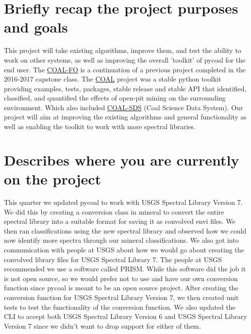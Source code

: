 \documentclass[onecolumn, draftclsnofoot,10pt, compsoc]{IEEEtran}
\begin{document}
\section{Briefly recap the project purposes and goals}

\noindent This project will take existing algorithms, improve them, and test the ability to work on other systems, as well as improving the overall 'toolkit' of pycoal for the end user. The \href{https://capstone-coal.github.io/team}{COAL-FO} is a continuation of a previous project completed in the 2016-2017 capstone class. The \href{https://capstone-coal.github.io/}{COAL} project was a stable python toolkit providing examples, tests, packages, stable release and stable API that identified, classified, and quantified the effects of open-pit mining on the surrounding environment. Which also included \href{https://github.com/capstone-coal/coal-sds}{COAL-SDS} (Coal Science Data System). Our project will aim at improving the existing algorithms and general functionality as well as enabling the toolkit to work with more spectral libraries. \newline

\section{Describes where you are currently on the project}
This quarter we updated pycoal to work with USGS Spectral Library Version 7. We did this by creating a conversion class in mineral to convert the entire spectral library into a suitable format for saving it as convolved envi files. We then ran classifications using the new spectral library and observed how we could now identify more spectra through our mineral classifications. \newline \newline
We also got into communication with people at USGS about how we would go about creating the convolved library files for USGS Spectral Library 7. The people at USGS recommended we use a software called PRISM. While this software did the job it is not open source, so we would prefer not to use and have our own conversion function since pycoal is meant to be an open source project. \newline \newline
After creating the conversion function for USGS Spectral Library Version 7, we then created unit tests to test the functionality of the conversion function.  We also updated the CLI to accept both USGS Spectral Library Version 6 and USGS Spectral Library Version 7 since we didn’t want to drop support for either of them.
\end{document}

